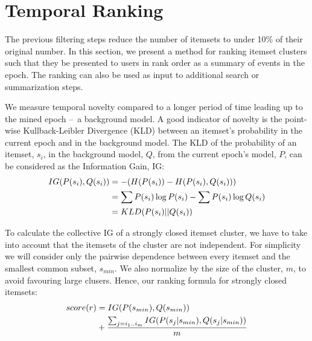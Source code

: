 \documentclass{sig-alternate}
\begin{document}
\section{Temporal Ranking}
\label{sec:rank}
The previous filtering steps reduce the number of itemsets to 
under 10\% of their original number.
In this section, we present a method for ranking itemset clusters 
such that they
be presented to users in rank order
as a summary of events in the epoch.
The ranking can also be
used as input to additional search or
summarization steps.

We measure temporal novelty compared to 
a longer period of time 
leading up to the mined epoch
--~a background model.
A good indicator of novelty is the point-wise Kullback-Leibler Divergence (KLD)
between an itemset's probability in the current epoch and in the background model.
The KLD of the probability of an itemset, $s_i$, in the background
model, $Q$, from the current epoch's model, $P$, can be considered as
the Information Gain, IG: 
\begin{align}IG(P(s_i),Q(s_i))  &= - (H(P(s_i)) - H(P(s_i),Q(s_i))) \notag\\ &= \sum{P(s_i) \log{P(s_i)}} - \sum{P(s_i) \log{Q(s_i)}} \notag\\ &= KLD(P(s_i)||Q(s_i))\end{align}

To calculate the collective IG of a strongly closed itemset cluster,
we have to take into account that the itemsets of the cluster are not independent. 
For simplicity we will consider only the pairwise dependence between 
every itemset and the smallest common subset, $s_{min}$.
We also normalize by the size of the cluster, $m$, to avoid favouring large clusers. Hence, our ranking formula for
strongly closed itemsets:
\begin{align}\label{eq:avgIG}score(r) &= IG(P(s_{min}), Q(s_{min})) \notag\\ &+ \frac{ \sum_{ j = i_1..i_m } { IG(P(s_j|s_{min}), Q(s_j|s_{min})) } } { m } \end{align}
\end{document}
